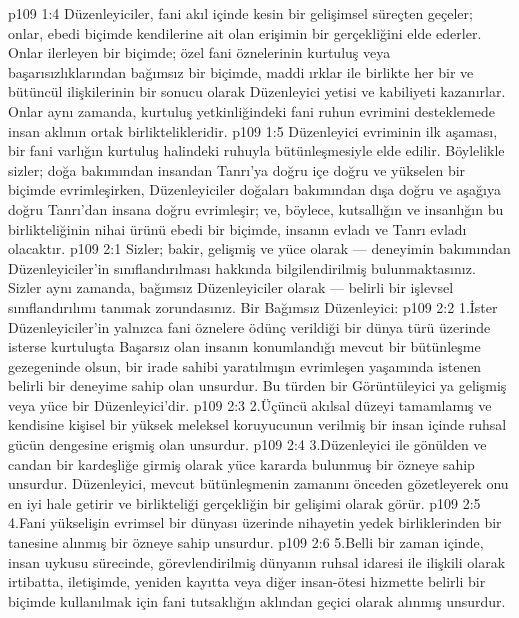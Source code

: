 \vs p109 1:4 Düzenleyiciler, fani akıl içinde kesin bir gelişimsel süreçten geçeler; onlar, ebedi biçimde kendilerine ait olan erişimin bir gerçekliğini elde ederler. Onlar ilerleyen bir biçimde; özel fani öznelerinin kurtuluş veya başarısızlıklarından bağımsız bir biçimde, maddi ırklar ile birlikte her bir ve bütüncül ilişkilerinin bir sonucu olarak Düzenleyici yetisi ve kabiliyeti kazanırlar. Onlar aynı zamanda, kurtuluş yetkinliğindeki fani ruhun evrimini desteklemede insan aklının ortak birliktelikleridir.
\vs p109 1:5 Düzenleyici evriminin ilk aşaması, bir fani varlığın kurtuluş halindeki ruhuyla bütünleşmesiyle elde edilir. Böylelikle sizler; doğa bakımından insandan Tanrı’ya doğru içe doğru ve yükselen bir biçimde evrimleşirken, Düzenleyiciler doğaları bakımından dışa doğru ve aşağıya doğru Tanrı’dan insana doğru evrimleşir; ve, böylece, kutsallığın ve insanlığın bu birlikteliğinin nihai ürünü ebedi bir biçimde, insanın evladı ve Tanrı evladı olacaktır.
\vs p109 2:1 Sizler; bakir, gelişmiş ve yüce olarak --- deneyimin bakımından Düzenleyiciler’in sınıflandırılması hakkında bilgilendirilmiş bulunmaktasınız. Sizler aynı zamanda, bağımsız Düzenleyiciler olarak --- belirli bir işlevsel sınıflandırılımı tanımak zorundasınız. Bir Bağımsız Düzenleyici:
\vs p109 2:2 1.\bibnobreakspace İster Düzenleyiciler’in yalnızca fani öznelere ödünç verildiği bir dünya türü üzerinde isterse kurtuluşta Başarsız olan insanın konumlandığı mevcut bir bütünleşme gezegeninde olsun, bir irade sahibi yaratılmışın evrimleşen yaşamında istenen belirli bir deneyime sahip olan unsurdur. Bu türden bir Görüntüleyici ya gelişmiş veya yüce bir Düzenleyici’dir.
\vs p109 2:3 2.\bibnobreakspace Üçüncü akılsal düzeyi tamamlamış ve kendisine kişisel bir yüksek meleksel koruyucunun verilmiş bir insan içinde ruhsal gücün dengesine erişmiş olan unsurdur.
\vs p109 2:4 3.\bibnobreakspace Düzenleyici ile gönülden ve candan bir kardeşliğe girmiş olarak yüce kararda bulunmuş bir özneye sahip unsurdur. Düzenleyici, mevcut bütünleşmenin zamanını önceden gözetleyerek onu en iyi hale getirir ve birlikteliği gerçekliğin bir gelişimi olarak görür.
\vs p109 2:5 4.\bibnobreakspace Fani yükselişin evrimsel bir dünyası üzerinde nihayetin yedek birliklerinden bir tanesine alınmış bir özneye sahip unsurdur.
\vs p109 2:6 5.\bibnobreakspace Belli bir zaman içinde, insan uykusu sürecinde, görevlendirilmiş dünyanın ruhsal idaresi ile ilişkili olarak irtibatta, iletişimde, yeniden kayıtta veya diğer insan\hyp{}ötesi hizmette belirli bir biçimde kullanılmak için fani tutsaklığın aklından geçici olarak alınmış unsurdur.
